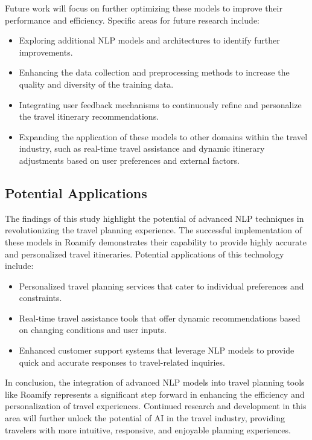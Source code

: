 \documentclass[conference]{IEEEtran}
\begin{document}
        Future work will focus on further optimizing these models to improve their performance and efficiency. Specific areas for future research include:
        \begin{itemize}
            \item Exploring additional NLP models and architectures to identify further improvements.
            \item Enhancing the data collection and preprocessing methods to increase the quality and diversity of the training data.
            \item Integrating user feedback mechanisms to continuously refine and personalize the travel itinerary recommendations.
            \item Expanding the application of these models to other domains within the travel industry, such as real-time travel assistance and dynamic itinerary adjustments based on user preferences and external factors.
        \end{itemize}

    \subsection{Potential Applications}

        The findings of this study highlight the potential of advanced NLP techniques in revolutionizing the travel planning experience. The successful implementation of these models in Roamify demonstrates their capability to provide highly accurate and personalized travel itineraries. Potential applications of this technology include:
        \begin{itemize}
            \item Personalized travel planning services that cater to individual preferences and constraints.
            \item Real-time travel assistance tools that offer dynamic recommendations based on changing conditions and user inputs.
            \item Enhanced customer support systems that leverage NLP models to provide quick and accurate responses to travel-related inquiries.
        \end{itemize}

        In conclusion, the integration of advanced NLP models into travel planning tools like Roamify represents a significant step forward in enhancing the efficiency and personalization of travel experiences. Continued research and development in this area will further unlock the potential of AI in the travel industry, providing travelers with more intuitive, responsive, and enjoyable planning experiences.
\end{document}

